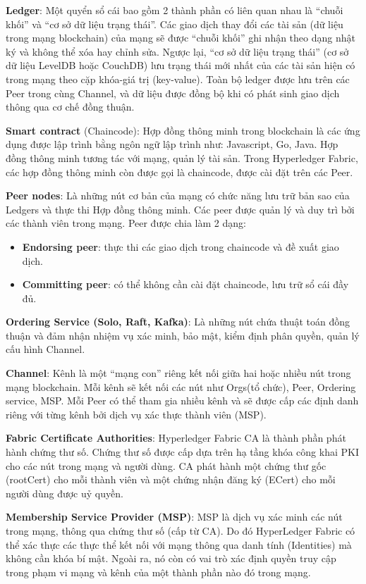 \textbf{Ledger}: Một quyển sổ cái bao gồm 2 thành phần có liên quan nhau là “chuỗi khối” và “cơ sở dữ liệu trạng thái”. Các giao dịch thay đổi các tài sản (dữ liệu trong mạng blockchain) của mạng sẽ được “chuỗi khối” ghi nhận theo dạng nhật ký và không thể xóa hay chỉnh sửa. Ngược lại, “cơ sở dữ liệu trạng thái” (cơ sở dữ liệu LevelDB hoặc CouchDB) lưu trạng thái mới nhất của các tài sản hiện có trong mạng theo cặp khóa-giá trị (key-value). Toàn bộ ledger được lưu trên các Peer trong cùng Channel, và dữ liệu được đồng bộ khi có phát sinh giao dịch thông qua cơ chế đồng thuận.

\textbf{Smart contract} (Chaincode): Hợp đồng thông minh trong blockchain là các ứng dụng được lập trình bằng ngôn ngữ lập trình như: Javascript, Go, Java. Hợp đồng thông minh tương tác với mạng, quản lý tài sản. Trong Hyperledger Fabric, các hợp đồng thông minh còn được gọi là chaincode, được cài đặt trên các Peer.

\textbf{Peer nodes}: Là những nút cơ bản của mạng có chức năng lưu trữ bản sao của Ledgers và thực thi Hợp đồng thông minh. Các peer được quản lý và duy trì bởi các thành viên trong mạng. Peer được chia làm 2 dạng:

\begin{itemize}
\item \textbf{Endorsing peer}: thực thi các giao dịch trong chaincode và đề xuất giao dịch.
\item \textbf{Committing peer}: có thể không cần cài đặt chaincode, lưu trữ sổ cái đầy đủ.
\end{itemize}

\textbf{Ordering Service (Solo, Raft, Kafka)}: Là những nút chứa thuật toán đồng thuận và đảm nhận nhiệm vụ xác minh, bảo mật, kiểm định phân quyền, quản lý cấu hình Channel.

\textbf{Channel}: Kênh là một “mạng con” riêng kết nối giữa hai hoặc nhiều nút trong mạng blockchain. Mỗi kênh sẽ kết nối các nút như Orgs(tổ chức), Peer, Ordering service, MSP. Mỗi Peer có thể tham gia nhiều kênh và sẽ được cấp các định danh riêng với từng kênh bởi dịch vụ xác thực thành viên (MSP).

\textbf{Fabric Certificate Authorities}: Hyperledger Fabric CA là thành phần phát hành chứng thư số. Chứng thư số được cấp dựa trên hạ tầng khóa công khai PKI cho các nút trong mạng và người dùng. CA phát hành một chứng thư gốc (rootCert) cho mỗi thành viên và một chứng nhận đăng ký (ECert) cho mỗi người dùng được uỷ quyền.

\textbf{Membership Service Provider (MSP)}: MSP là dịch vụ xác minh các nút trong mạng, thông qua chứng thư số (cấp từ CA). Do đó HyperLedger Fabric có thể xác thực các thực thể kết nối với mạng thông qua danh tính (Identities) mà không cần khóa bí mật. Ngoài ra, nó còn có vai trò xác định quyền truy cập trong phạm vi mạng và kênh của một thành phần nào đó trong mạng.